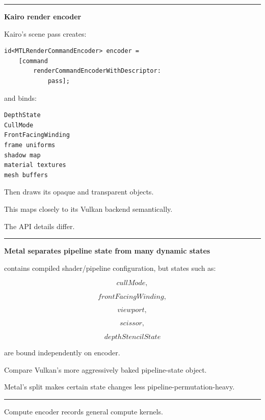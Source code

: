 \begin{center}\rule{0.5\linewidth}{0.5pt}\end{center}

\textbf{Kairo render encoder}

Kairo's scene pass creates:

\begin{verbatim}
id<MTLRenderCommandEncoder> encoder =
    [command
        renderCommandEncoderWithDescriptor:
            pass];
\end{verbatim}

and binds:

\begin{verbatim}
DepthState
CullMode
FrontFacingWinding
frame uniforms
shadow map
material textures
mesh buffers
\end{verbatim}

Then draws its opaque and transparent objects.

This maps closely to its Vulkan backend semantically.

The API details differ.

\begin{center}\rule{0.5\linewidth}{0.5pt}\end{center}

\textbf{Metal separates pipeline state from many dynamic states}

 contains compiled shader/pipeline configuration, but states such as:

\[
cullMode,
\]

\[
frontFacingWinding,
\]

\[
viewport,
\]

\[
scissor,
\]

\[
depthStencilState
\]

are bound independently on encoder.

Compare Vulkan's more aggressively baked pipeline-state object.

Metal's split makes certain state changes less pipeline-permutation-heavy.

\begin{center}\rule{0.5\linewidth}{0.5pt}\end{center}

\textbf{}

Compute encoder records general compute kernels.

